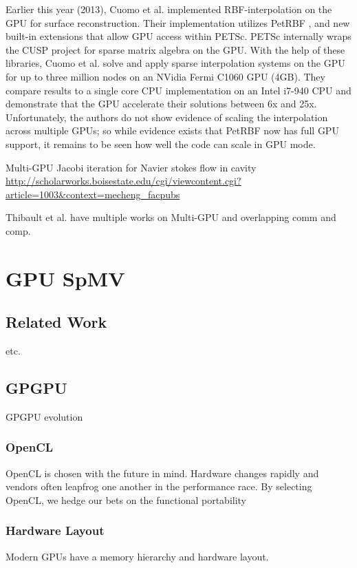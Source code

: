 \documentclass{report}
\begin{document}
Earlier this year (2013), Cuomo et al. \cite{Cuomo2013} implemented RBF-interpolation on the GPU for surface reconstruction. Their implementation utilizes PetRBF \cite{Yokota2010}, and new built-in extensions that allow GPU access within PETSc. PETSc internally wraps the CUSP project \cite{CUSP} for sparse matrix algebra on the GPU. With the help of these libraries, Cuomo et al. solve and apply sparse interpolation systems on the GPU for up to three million nodes on an NVidia Fermi C1060 GPU (4GB). They compare results to a single core CPU implementation on an Intel i7-940 CPU and demonstrate that the GPU accelerate their solutions between 6x and 25x. Unfortunately, the authors do not show evidence of scaling the interpolation across multiple GPUs; so while evidence exists that PetRBF now has full GPU support, it remains to be seen how well the code can scale in GPU mode. 
 
 
Multi-GPU Jacobi iteration for Navier stokes flow in cavity \url{http://scholarworks.boisestate.edu/cgi/viewcontent.cgi?article=1003&context=mecheng_facpubs}

Thibault et al. have multiple works on Multi-GPU and overlapping comm and comp. 

\chapter{GPU SpMV}

\section{Related Work}
\cite{Bell2009} \cite{Kreuzer2012}
\cite{Vuduc2005} etc. 

\section{GPGPU}
GPGPU evolution
\subsection{OpenCL}
OpenCL is chosen with the future in mind. Hardware changes rapidly and vendors often leapfrog one another in the performance race. By selecting OpenCL, we hedge our bets on the functional portability

\subsection{Hardware Layout}
Modern GPUs have a memory hierarchy and hardware layout. 
\end{document}
